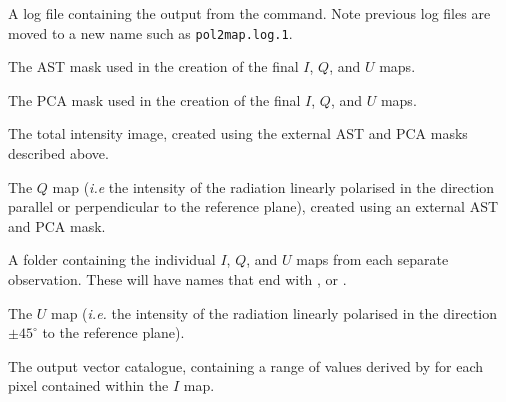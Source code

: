 \begin{aligndesc}
\item[\file{pol2map.log}] A log file containing the output from the
   command. Note previous log files are moved to a new name
  such as \texttt{pol2map.log.1}.

\item[\file{astmask.sdf}] The AST mask used in the creation
  of the final $I$, $Q$, and $U$ maps.

\item[\file{pcamask.sdf}] The PCA mask used in the creation of the
  final $I$, $Q$, and $U$ maps.

\item[\file{iext.sdf}] The total intensity image, created using the
  external AST and PCA masks described above.

\item[\file{qext.sdf}] The $Q$ map (\emph{i.e} the intensity of the radiation
  linearly polarised in the direction parallel or perpendicular to the
  reference plane), created using an external AST and PCA mask.

\item[\file{maps/}] A folder containing the individual $I$, $Q$, and $U$
  maps from each separate observation. These will have names that end with
  ,  or .

\item[\file{uext.sdf}] The $U$ map (\emph{i.e.} the intensity of the radiation
  linearly polarised in the direction $\pm45^{\circ }$ to the reference plane).

\item[\file{mycat.FIT}] The output vector catalogue, containing a
  range of values derived by  for each pixel contained within
  the $I$ map.

\end{aligndesc}


